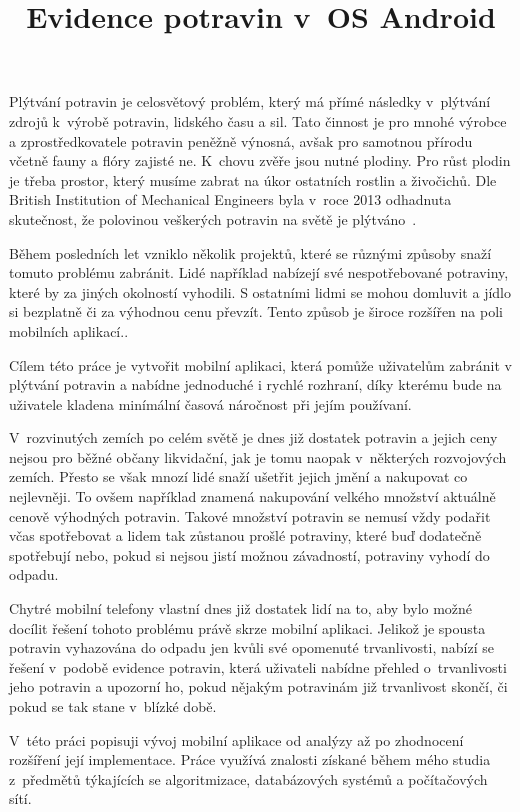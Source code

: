 \documentclass[thesis=B,czech]{FITthesis}[2013/10/20]
\title{Evidence potravin v~OS Android}
\begin{document}

\begin{introduction}

Plýtvání potravin je celosvětový problém, který má přímé následky v~plýtvání zdrojů k~výrobě potravin, lidského času a sil. Tato činnost je pro mnohé výrobce a zprostředkovatele potravin peněžně výnosná, avšak pro samotnou přírodu včetně fauny a flóry zajisté ne. K~chovu zvěře jsou nutné plodiny. Pro růst plodin je třeba prostor, který musíme zabrat na úkor ostatních rostlin a živočichů. Dle British Institution of Mechanical Engineers byla v~roce 2013 odhadnuta skutečnost, že polovinou veškerých potravin na světě je plýtváno~\cite{fakta}.

Během posledních let vzniklo několik projektů, které se různými způsoby snaží tomuto problému zabránit. Lidé například nabízejí své nespotřebované potraviny, které by za jiných okolností vyhodili. S ostatními lidmi se mohou domluvit a jídlo si bezplatně či za výhodnou cenu převzít. Tento způsob je široce rozšířen na poli mobilních aplikací..

Cílem této práce je vytvořit mobilní aplikaci, která pomůže uživatelům zabránit v plýtvání potravin a nabídne jednoduché i rychlé rozhraní, díky kterému bude na uživatele kladena minímální časová náročnost při jejím používaní.

V~rozvinutých zemích po celém světě je dnes již dostatek potravin a jejich ceny nejsou pro běžné občany likvidační, jak je tomu naopak v~některých rozvojových zemích. Přesto se však mnozí lidé snaží ušetřit jejich jmění a nakupovat co nejlevněji. To ovšem například znamená nakupování velkého množství aktuálně cenově výhodných potravin. Takové množství potravin se nemusí vždy podařit včas spotřebovat a lidem tak zůstanou prošlé potraviny, které buď dodatečně spotřebují nebo, pokud si nejsou jistí možnou závadností, potraviny vyhodí do odpadu.

Chytré mobilní telefony vlastní dnes již dostatek lidí na to, aby bylo možné docílit řešení tohoto problému právě skrze mobilní aplikaci. Jelikož je spousta potravin vyhazována do odpadu jen kvůli své opomenuté trvanlivosti, nabízí se řešení v~podobě evidence potravin, která uživateli nabídne přehled o~trvanlivosti jeho potravin a upozorní ho, pokud nějakým potravinám již trvanlivost skončí, či pokud se tak stane v~blízké době.

V~této práci popisuji vývoj mobilní aplikace od analýzy až po zhodnocení rozšíření její implementace. Práce využívá znalosti získané během mého studia z~předmětů týkajících se algoritmizace, databázových systémů a počítačových sítí.

\end{introduction}
\end{document}
